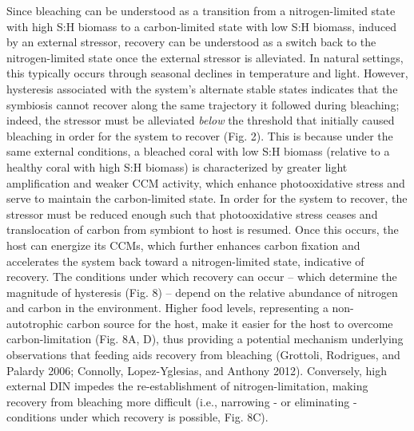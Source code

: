 \documentclass[]{elsarticle} %
\begin{document}
Since bleaching can be understood as a transition from a
nitrogen-limited state with high S:H biomass to a carbon-limited state
with low S:H biomass, induced by an external stressor, recovery can be
understood as a switch back to the nitrogen-limited state once the
external stressor is alleviated. In natural settings, this typically
occurs through seasonal declines in temperature and light. However,
hysteresis associated with the system's alternate stable states
indicates that the symbiosis cannot recover along the same trajectory it
followed during bleaching; indeed, the stressor must be alleviated
\emph{below} the threshold that initially caused bleaching in order for
the system to recover (Fig. 2). This is because under the same external
conditions, a bleached coral with low S:H biomass (relative to a healthy
coral with high S:H biomass) is characterized by greater light
amplification and weaker CCM activity, which enhance photooxidative
stress and serve to maintain the carbon-limited state. In order for the
system to recover, the stressor must be reduced enough such that
photooxidative stress ceases and translocation of carbon from symbiont
to host is resumed. Once this occurs, the host can energize its CCMs,
which further enhances carbon fixation and accelerates the system back
toward a nitrogen-limited state, indicative of recovery. The conditions
under which recovery can occur -- which determine the magnitude of
hysteresis (Fig. 8) -- depend on the relative abundance of nitrogen and
carbon in the environment. Higher food levels, representing a
non-autotrophic carbon source for the host, make it easier for the host
to overcome carbon-limitation (Fig. 8A, D), thus providing a potential
mechanism underlying observations that feeding aids recovery from
bleaching (Grottoli, Rodrigues, and Palardy 2006; Connolly,
Lopez-Yglesias, and Anthony 2012). Conversely, high external DIN impedes
the re-establishment of nitrogen-limitation, making recovery from
bleaching more difficult (i.e., narrowing - or eliminating - conditions
under which recovery is possible, Fig. 8C).
\end{document}
